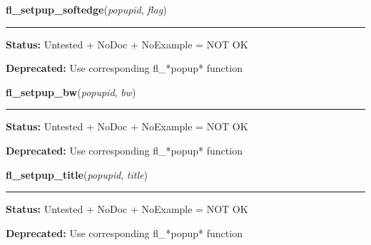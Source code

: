     \vspace{0.5ex}

\hspace{.8\funcindent}\begin{boxedminipage}{\funcwidth}

    \raggedright \textbf{fl\_setpup\_softedge}(\textit{popupid}, \textit{flag})

    \vspace{-1.5ex}

    \rule{\textwidth}{0.5\fboxrule}
\setlength{\parskip}{2ex}
\setlength{\parskip}{1ex}
\textbf{Status:} Untested + NoDoc + NoExample = NOT OK



\textbf{Deprecated:} Use corresponding fl\_*popup* function



    \end{boxedminipage}

    \label{xformslib:library:fl_setpup_bw}

    \vspace{0.5ex}

\hspace{.8\funcindent}\begin{boxedminipage}{\funcwidth}

    \raggedright \textbf{fl\_setpup\_bw}(\textit{popupid}, \textit{bw})

    \vspace{-1.5ex}

    \rule{\textwidth}{0.5\fboxrule}
\setlength{\parskip}{2ex}
\setlength{\parskip}{1ex}
\textbf{Status:} Untested + NoDoc + NoExample = NOT OK



\textbf{Deprecated:} Use corresponding fl\_*popup* function



    \end{boxedminipage}

    \label{xformslib:library:fl_setpup_title}

    \vspace{0.5ex}

\hspace{.8\funcindent}\begin{boxedminipage}{\funcwidth}

    \raggedright \textbf{fl\_setpup\_title}(\textit{popupid}, \textit{title})

    \vspace{-1.5ex}

    \rule{\textwidth}{0.5\fboxrule}
\setlength{\parskip}{2ex}
\setlength{\parskip}{1ex}
\textbf{Status:} Untested + NoDoc + NoExample = NOT OK



\textbf{Deprecated:} Use corresponding fl\_*popup* function



    \end{boxedminipage}

